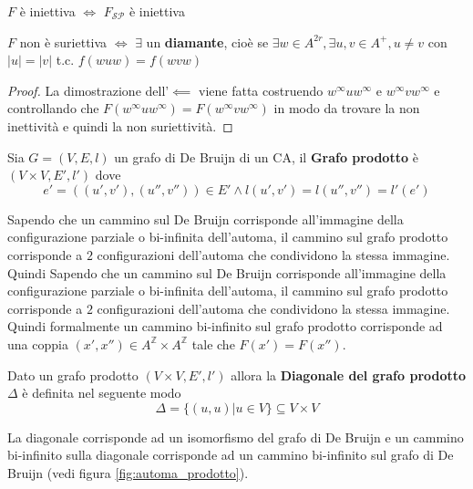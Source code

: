\begin{teorema}
    $F$ è iniettiva $\iff$ $F_{\mathcal{SP}}$ è iniettiva
\end{teorema}

\begin{teorema}
    $F$ non è suriettiva $\iff$ $\exists$ un \textbf{diamante}, cioè se
    $\exists w \in A^{2r}, \exists u,v \in A^+, u\ne v$ con $|u|=|v|$ t.c. $f(wuw)=f(wvw)$
    \begin{proof}
        La dimostrazione dell'$\impliedby$ viene fatta costruendo $w^\infty u w^\infty$
        e $w^\infty v w^\infty$ e controllando che $F(w^\infty u w^\infty) = F(w^\infty v w^\infty)$
        in modo da trovare la non inettività e quindi la non suriettività.
    \end{proof}
\end{teorema}

\begin{definizione}
    Sia $G=(V,E,l)$ un grafo di De Bruijn di un CA, il \textbf{Grafo prodotto}
    è $(V\times V,E',l')$ dove $$e'=((u',v'), (u'',v''))\in E'\land l(u',v') = l(u'',v'') = l'(e')$$
\end{definizione}

Sapendo che un cammino sul De Bruijn corrisponde all'immagine della configurazione
parziale o bi-infinita dell'automa, il cammino sul grafo prodotto corrisponde
a $2$ configurazioni dell'automa che condividono la stessa immagine. Quindi
Sapendo che un cammino sul De Bruijn corrisponde all'immagine della configurazione
parziale o bi-infinita dell'automa, il cammino sul grafo prodotto corrisponde
a $2$ configurazioni dell'automa che condividono la stessa immagine. Quindi
formalmente un cammino bi-infinito sul grafo prodotto corrisponde ad una coppia
$(x',x'')\in A^\mathbb{Z} \times A^\mathbb{Z} $ tale che $F(x')=F(x'')$.

\begin{definizione}
    Dato un grafo prodotto $(V\times V,E',l')$ allora la \textbf{Diagonale del grafo prodotto}
    $\Delta$ è definita nel seguente modo
    $$\Delta = \{(u,u)| u \in V\}\subseteq V\times V$$
\end{definizione}
La diagonale corrisponde ad un isomorfismo del grafo di De Bruijn e un cammino
bi-infinito sulla diagonale corrisponde ad un cammino bi-infinito sul grafo di De
Bruijn (vedi figura \ref{fig:automa_prodotto}).

